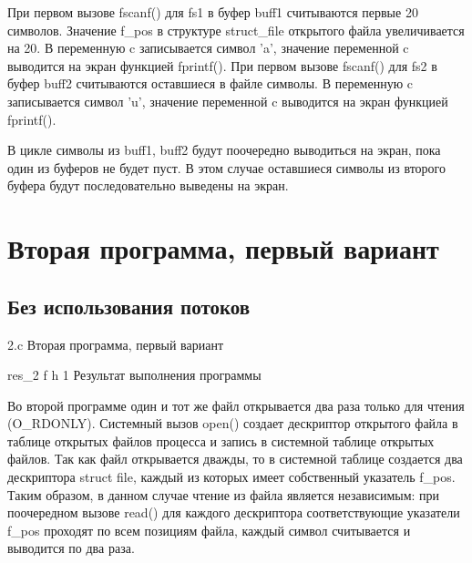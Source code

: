 При первом вызове fscanf() для fs1 в буфер buff1 считываются первые 20 символов.
Значение f\_pos в структуре struct\_file открытого файла увеличивается на 20.
В переменную c записывается символ 'a', значение переменной c выводится на экран функцией fprintf().
При первом вызове fscanf() для fs2 в буфер buff2 считываются оставшиеся в файле символы.
В переменную c записывается символ 'u', значение переменной c выводится на экран функцией fprintf().
 
В цикле символы из buff1, buff2 будут поочередно выводиться на экран, пока один из буферов не будет пуст.
В этом случае оставшиеся символы из второго буфера будут последовательно выведены на экран.


\clearpage

\section{Вторая программа, первый вариант}

\subsection{Без использования потоков}

{2.c} %
{Вторая программа, первый вариант} %

{res_2} %
{f} %
{h} %
{1\textwidth} %
{Результат выполнения программы} %


Во второй программе один и тот же файл открывается два раза только для чтения (O\_RDONLY).
Системный вызов open() создает дескриптор открытого файла в таблице открытых файлов процесса и запись в системной таблице открытых файлов.
Так как файл открывается дважды, то в системной таблице создается два дескриптора struct file, каждый из которых имеет собственный указатель f\_pos.
Таким образом, в данном случае чтение из файла является независимым: при поочередном вызове read() для каждого дескриптора соответствующие указатели f\_pos проходят по всем позициям файла, каждый символ считывается и выводится по два раза.

